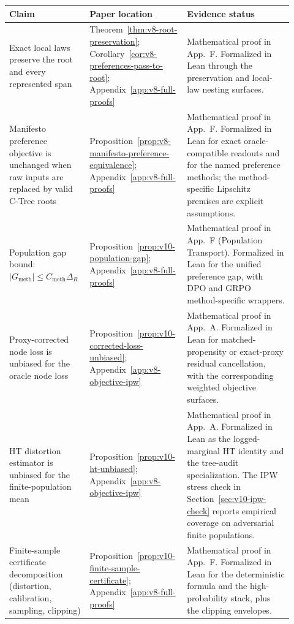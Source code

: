 \begin{table}[t]
\centering
\scriptsize
\renewcommand{\arraystretch}{1.15}
\begin{tabular}{@{}p{0.26\linewidth}p{0.30\linewidth}p{0.36\linewidth}@{}}
\toprule
Claim & Paper location & Evidence status \\
\midrule
Exact local laws preserve the root and every represented span &
Theorem~\ref{thm:v8-root-preservation};
Corollary~\ref{cor:v8-preferences-pass-to-root};
Appendix~\ref{app:v8-full-proofs} &
Mathematical proof in App.~F. Formalized in Lean through the
preservation and local-law nesting surfaces. \\
\addlinespace
Manifesto preference objective is unchanged when raw inputs are
replaced by valid C-Tree roots &
Proposition~\ref{prop:v8-manifesto-preference-equivalence};
Appendix~\ref{app:v8-full-proofs} &
Mathematical proof in App.~F. Formalized in Lean for exact
oracle-compatible readouts and for the named preference methods;
the method-specific Lipschitz premises are explicit assumptions. \\
\addlinespace
Population gap bound:
\(|G_{\mathrm{meth}}|\le C_{\mathrm{meth}}\Delta_R\) &
Proposition~\ref{prop:v10-population-gap};
Appendix~\ref{app:v8-full-proofs} &
Mathematical proof in App.~F (Population Transport). Formalized in
Lean for the unified preference gap, with DPO and GRPO method-specific
wrappers. \\
\addlinespace
Proxy-corrected node loss is unbiased for the oracle node loss &
Proposition~\ref{prop:v10-corrected-loss-unbiased};
Appendix~\ref{app:v8-objective-ipw} &
Mathematical proof in App.~A. Formalized in Lean for matched-propensity
or exact-proxy residual cancellation, with the corresponding weighted
objective surfaces. \\
\addlinespace
HT distortion estimator is unbiased for the finite-population mean &
Proposition~\ref{prop:v10-ht-unbiased};
Appendix~\ref{app:v8-objective-ipw} &
Mathematical proof in App.~A. Formalized in Lean as the
logged-marginal HT identity and the tree-audit specialization. The
IPW stress check in Section~\ref{sec:v10-ipw-check} reports empirical
coverage on adversarial finite populations. \\
\addlinespace
Finite-sample certificate decomposition (distortion, calibration,
sampling, clipping) &
Proposition~\ref{prop:v10-finite-sample-certificate};
Appendix~\ref{app:v8-full-proofs} &
Mathematical proof in App.~F. Formalized in Lean for the
deterministic formula and the high-probability stack, plus the
clipping envelopes. \\

\end{tabular}
\end{table}
